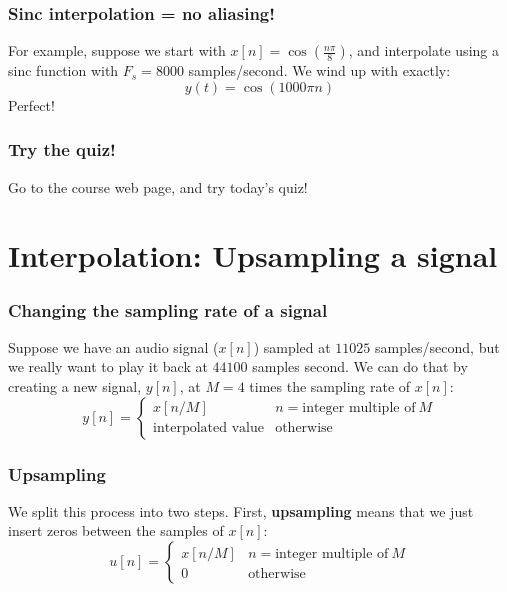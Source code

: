 \documentclass{beamer}
\begin{document}
\begin{frame}
  \frametitle{Sinc interpolation = no aliasing!}

  For example, suppose we start with
  $x[n]=\cos\left(\frac{n\pi}{8}\right)$, and interpolate using a
  sinc function with $F_s=8000$ samples/second.  We wind up with exactly:
  \begin{displaymath}
    y(t) = \cos\left(1000\pi n\right)
  \end{displaymath}
  Perfect!
\end{frame}

\begin{frame}
  \frametitle{Try the quiz!}

  Go to the course web page, and try today's quiz!
\end{frame}

\section[Interpolation]{Interpolation: Upsampling a signal}
\setcounter{subsection}{1}

\begin{frame}
  \frametitle{Changing the sampling rate of a signal}

  Suppose we have an audio signal ($x[n]$) sampled at $11025$
  samples/second, but we really want to play it back at $44100$
  samples second.  We can do that by creating a new signal, $y[n]$, at
  $M=4$ times the sampling rate of $x[n]$:
  \begin{displaymath}
    y[n] = \left\{\begin{array}{ll}
    x[n/M] & n=\text{integer multiple of}~M\\
    \text{interpolated value}&\text{otherwise}
    \end{array}\right.
  \end{displaymath}
\end{frame}

\begin{frame}
  \frametitle{Upsampling}

  We split this process into two steps.  First, {\bf upsampling} means
  that we just insert zeros between the samples of $x[n]$:
  \begin{displaymath}
    u[n] = \left\{\begin{array}{ll}
    x[n/M] & n=\text{integer multiple of}~M\\
    0&\text{otherwise}
    \end{array}\right.
  \end{displaymath}
\end{frame}
\end{document}
